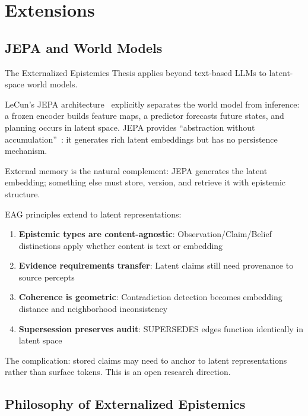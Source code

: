 \documentclass[11pt,letterpaper]{article}
\begin{document}
\section{Extensions}
\label{sec:extensions}

\subsection{JEPA and World Models}

The Externalized Epistemics Thesis applies beyond text-based LLMs to latent-space world models.

LeCun's JEPA architecture~\cite{lecun2022path} explicitly separates the world model from inference: a frozen encoder builds feature maps, a predictor forecasts future states, and planning occurs in latent space. JEPA provides ``abstraction without accumulation''~\cite{aampe2026}: it generates rich latent embeddings but has no persistence mechanism.

External memory is the natural complement: JEPA generates the latent embedding; something else must store, version, and retrieve it with epistemic structure.

EAG principles extend to latent representations:

\begin{enumerate}[noitemsep]
    \item \textbf{Epistemic types are content-agnostic}: Observation/Claim/Belief distinctions apply whether content is text or embedding
    \item \textbf{Evidence requirements transfer}: Latent claims still need provenance to source percepts
    \item \textbf{Coherence is geometric}: Contradiction detection becomes embedding distance and neighborhood inconsistency
    \item \textbf{Supersession preserves audit}: SUPERSEDES edges function identically in latent space
\end{enumerate}

The complication: stored claims may need to anchor to latent representations rather than surface tokens. This is an open research direction.

\subsection{Philosophy of Externalized Epistemics}
\end{document}
